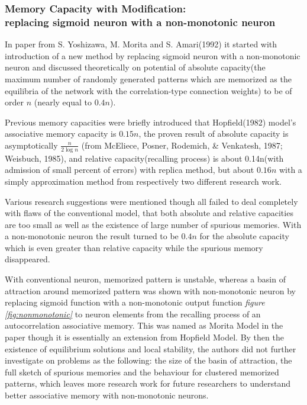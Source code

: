 \subsubsection{Memory Capacity with Modification: \\ replacing sigmoid neuron with a non-monotonic neuron}
In paper from S. Yoshizawa, M. Morita and S. Amari(1992) \cite{capacity_of_nonmonotonic_model} it started with introduction of a new method by replacing sigmoid neuron with a non-monotonic neuron and discussed theoretically on potential of absolute capacity(the maximum number of randomly generated patterns which are memorized as the equilibria of the network with the correlation-type connection weights) to be of order $n$ (nearly equal to $0.4n$).

Previous memory capacities were briefly introduced that Hopfield(1982) model's associative memory capacity is $0.15n$, the proven result of absolute capacity is asymptotically $ \frac{n}{2\log{n}} $ (from McEliece, Posner, Rodemich, \& Venkatesh, 1987; Weisbuch, 1985), and relative capacity(recalling process) is about 0.14n(with admission of small percent of errors) with replica method, but about $0.16n$ with a simply approximation method from respectively two different research work.

Various research suggestions were mentioned though all failed to deal completely with flaws of the conventional model, that both absolute and relative capacities are too small as well as the existence of large number of spurious memories. With a non-monotonic neuron the result turned to be $0.4n$ for the absolute capacity which is even greater than relative capacity while the spurious memory disappeared.

With conventional neuron, memorized pattern is unstable, whereas a basin of attraction around memorized pattern was shown with non-monotonic neuron by replacing sigmoid function with a non-monotonic output function \textit{figure \ref{fig:nonmonotonic}} to neuron elements from the recalling process of an autocorrelation associative memory. This was named as Morita Model in the paper though it is essentially an extension from Hopfield Model.
By then the existence of equilibrium solutions and local stability, the authors did not further investigate on problems as the following: the size of the basin of attraction, the full sketch of spurious memories and the behaviour for clustered memorized patterns, which leaves more research work for future researchers to understand better associative memory with non-monotonic neurons.

